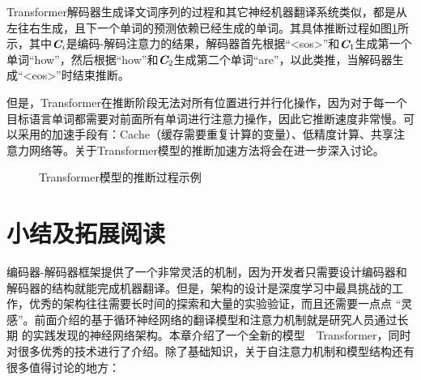 \parinterval Transformer解码器生成译文词序列的过程和其它神经机器翻译系统类似，都是从左往右生成，且下一个单词的预测依赖已经生成的单词。其具体推断过程如图\ref{fig:12-19}所示，其中$\textbf{\em C}_i$是编码-解码注意力的结果，解码器首先根据“<sos>”和$\textbf{\em C}_1$生成第一个单词“how”，然后根据“how”和$\textbf{\em C}_2$生成第二个单词“are”，以此类推，当解码器生成“<eos>”时结束推断。

\parinterval 但是，Transformer在推断阶段无法对所有位置进行并行化操作，因为对于每一个目标语言单词都需要对前面所有单词进行注意力操作，因此它推断速度非常慢。可以采用的加速手段有：Cache（缓存需要重复计算的变量）、低精度计算、共享注意力网络等。关于Transformer模型的推断加速方法将会在{\chapterfourteen}进一步深入讨论。

\begin{figure}[htp]
\centering

\caption{Transformer模型的推断过程示例}
\label{fig:12-19}
\end{figure}



\section{小结及拓展阅读}

\parinterval 编码器­-解码器框架提供了一个非常灵活的机制，因为开发者只需要设计编码器和解码器的结构就能完成机器翻译。但是，架构的设计是深度学习中最具挑战的工
作，优秀的架构往往需要长时间的探索和大量的实验验证，而且还需要一点点 “灵感”。前面介绍的基于循环神经网络的翻译模型和注意力机制就是研究人员通过长期
的实践发现的神经网络架构。本章介绍了一个全新的模型\ \dash \ Transformer，同时对很多优秀的技术进行了介绍。除了基础知识，关于自注意力机制和模型结构还有很多值得讨论的地方：

